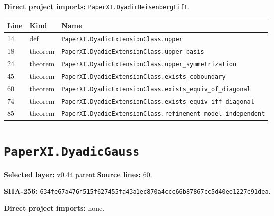 \documentclass[10pt,oneside]{book}
\begin{document}
\textbf{Direct project imports:} \nolinkurl{PaperXI.DyadicHeisenbergLift}.

\begin{longtable}{@{}p{}p{}p{}@{}}\toprule Line&Kind&Name\\\midrule\endhead

14&def&\nolinkurl{PaperXI.DyadicExtensionClass.upper}\\

18&theorem&\nolinkurl{PaperXI.DyadicExtensionClass.upper_basis}\\

24&theorem&\nolinkurl{PaperXI.DyadicExtensionClass.upper_symmetrization}\\

45&theorem&\nolinkurl{PaperXI.DyadicExtensionClass.exists_coboundary}\\

60&theorem&\nolinkurl{PaperXI.DyadicExtensionClass.exists_equiv_of_diagonal}\\

74&theorem&\nolinkurl{PaperXI.DyadicExtensionClass.exists_equiv_iff_diagonal}\\

85&theorem&\nolinkurl{PaperXI.DyadicExtensionClass.refinement_model_independent}\\

\bottomrule\end{longtable}

\section{\texorpdfstring{\nolinkurl{PaperXI.DyadicGauss}}{PaperXI.DyadicGauss}}\label{module:PaperXI.DyadicGauss}

\textbf{Selected layer:} v0.44 parent.\quad\textbf{Source lines:} 60.\par\textbf{SHA-256:} {\scriptsize\nolinkurl{634fe67a476f515f627455fa43a1ec870a4ccc66b87867cc5d40ee1227c91dea}}.


\textbf{Direct project imports:} none.
\end{document}
